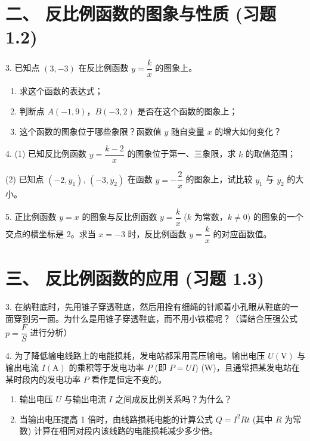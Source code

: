 \documentclass[12pt, a4paper]{article}
\begin{document}

\section*{二、 反比例函数的图象与性质 (习题 1.2)}

\begin{questionbox}[图象与点]
3. 已知点 $(3, -3)$ 在反比例函数 $y = \dfrac{k}{x}$ 的图象上。
\begin{enumerate}[label=(\arabic*)]
    \item 求这个函数的表达式；
    \item 判断点 $A(-1, 9)$，$B(-3, 2)$ 是否在这个函数的图象上；
    \item 这个函数的图象位于哪些象限？函数值 $y$ 随自变量 $x$ 的增大如何变化？
\end{enumerate}
\end{questionbox}

\begin{questionbox}[参数性质]
4. (1) 已知反比例函数 $y = \dfrac{k-2}{x}$ 的图象位于第一、三象限，求 $k$ 的取值范围；

(2) 已知点 $(-2, y_1)$, $(-3, y_2)$ 在函数 $y = -\dfrac{2}{x}$ 的图象上，试比较 $y_1$ 与 $y_2$ 的大小。
\end{questionbox}

\begin{questionbox}[函数交点]
5. 正比例函数 $y=x$ 的图象与反比例函数 $y = \dfrac{k}{x}$ ($k$ 为常数，$k \neq 0$) 的图象的一个交点的横坐标是 2。求当 $x = -3$ 时，反比例函数 $y = \dfrac{k}{x}$ 的对应函数值。
\end{questionbox}

\vspace{0.2cm}

\section*{三、 反比例函数的应用 (习题 1.3)}

\begin{questionbox}[B组 物理应用]
3. 在纳鞋底时，先用锥子穿透鞋底，然后用拴有细绳的针顺着小孔眼从鞋底的一面穿到另一面。为什么是用锥子穿透鞋底，而不用小铁棍呢？（请结合压强公式 $p=\dfrac{F}{S}$ 进行分析）

4. 为了降低输电线路上的电能损耗，发电站都采用高压输电。输出电压 $U (\text{V})$ 与输出电流 $I (\text{A})$ 的乘积等于发电功率 $P$ (即 $P = UI$) (W)，且通常把某发电站在某时段内的发电功率 $P$ 看作是恒定不变的。
\begin{enumerate}[label=(\arabic*), itemsep=5pt]
    \item 输出电压 $U$ 与输出电流 $I$ 之间成反比例关系吗？为什么？
    \item 当输出电压提高 1 倍时，由线路损耗电能的计算公式 $Q = I^2Rt$ (其中 $R$ 为常数) 计算在相同对段内该线路的电能损耗减少多少倍。
\end{enumerate}
\end{questionbox}
\end{document}
